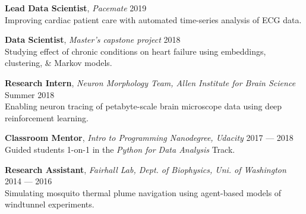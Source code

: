 \documentclass[a4paper,12pt]{article}
\newcommand{\resheading}[1]{{\vspace*{.001in} \colorbox{mygrey}{\begin{minipage}{\textwidth}{\textmd{\large \textbf{#1} \vphantom{p\^{E}}}}\end{minipage}}} }
\newcommand{\ressubheading}[4]{
        \textbf{#1} \hfill #2\\
        \textit{#3} \hfill #4 \\}
\begin{document}
{\setlength{\parskip}{8pt}

\textbf{Lead Data Scientist}, \textit{Pacemate} \hfill 2019 \\
Improving cardiac patient care with automated time-series analysis of ECG data.

\textbf{Data Scientist}, \textit{Master's capstone project} \hfill 2018\\
Studying effect of chronic conditions on heart failure using embeddings, clustering, \& Markov models.

\textbf{Research Intern}, \textit{Neuron Morphology Team, Allen Institute for Brain Science} \hfill Summer 2018\\
Enabling neuron tracing of petabyte-scale brain microscope data using deep reinforcement learning.


\textbf{Classroom Mentor}, \textit{Intro to Programming Nanodegree, Udacity} \hfill 2017 --- 2018\\
Guided students 1-on-1 in the \textit{Python for Data Analysis} Track.

\textbf{Research Assistant}, \textit{Fairhall Lab, Dept. of Biophysics, Uni. of Washington} \hfill 2014 --- 2016\\
Simulating mosquito thermal plume navigation using agent-based models of windtunnel experiments.\\


}
%
%
%
%
\end{document}
